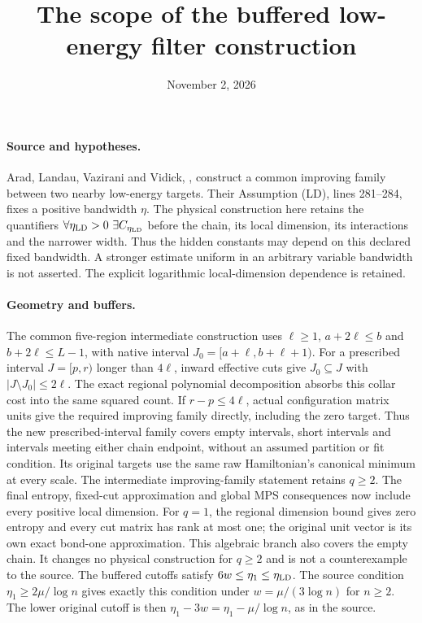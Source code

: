 \documentclass{article}
\title{The scope of the buffered low-energy filter construction}
\author{}
\date{November 2, 2026}
\begin{document}
\maketitle
{}

\paragraph{Source and hypotheses.}
Arad, Landau, Vazirani and Vidick,
\cite[Theorem~t:aisgapless, lines 1027--1041]{Arad2016RigorousRG},
construct a common improving family between two nearby low-energy targets.
Their Assumption (LD), lines 281--284, fixes a positive bandwidth $\eta$.
The physical construction here retains the quantifiers
$\forall\eta_{\rm LD}>0\ \exists C_{\eta_{\rm LD}}$ before the chain,
its local dimension, its interactions and the narrower width.
Thus the hidden constants may depend on this declared fixed bandwidth.
A stronger estimate uniform in an arbitrary variable bandwidth is not
asserted. The explicit logarithmic local-dimension dependence is retained.

\paragraph{Geometry and buffers.}
The common five-region intermediate construction uses
$\ell\ge1$, $a+2\ell\le b$ and $b+2\ell\le L-1$, with native interval
$J_0=[a+\ell,b+\ell+1)$.
For a prescribed interval $J=[p,r)$ longer than $4\ell$, inward effective
cuts give $J_0\subseteq J$ with $|J\setminus J_0|\le2\ell$.
The exact regional polynomial decomposition absorbs this collar cost into
the same squared count. If $r-p\le4\ell$, actual configuration matrix
units give the required improving family directly, including the zero
target. Thus the new prescribed-interval family covers empty intervals,
short intervals and intervals meeting either chain endpoint, without an
assumed partition or fit condition. Its original targets use the same raw
Hamiltonian's canonical minimum at every scale.
The intermediate improving-family statement retains $q\ge2$.
The final entropy, fixed-cut approximation and global MPS consequences now
include every positive local dimension. For $q=1$, the regional dimension
bound gives zero entropy and every cut matrix has rank at most one; the
original unit vector is its own exact bond-one approximation. This
algebraic branch also covers the empty chain. It changes no physical
construction for $q\ge2$ and is not a counterexample to the source.
The buffered cutoffs satisfy $6w\le\eta_1\le\eta_{\rm LD}$.
The source condition $\eta_1\ge2\mu/\log n$ gives exactly this condition
under $w=\mu/(3\log n)$ for $n\ge2$. The lower original cutoff is then
$\eta_1-3w=\eta_1-\mu/\log n$, as in the source.
\end{document}
